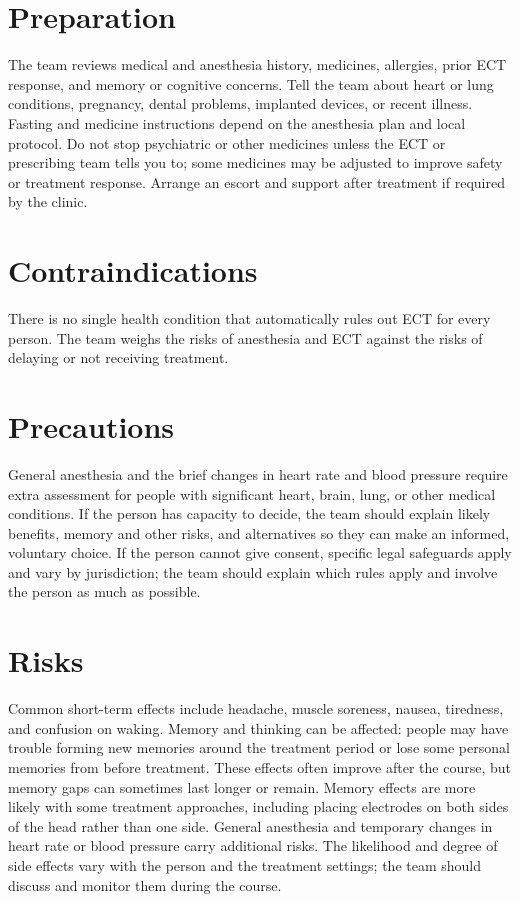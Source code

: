 \section*{Preparation}
The team reviews medical and anesthesia history, medicines, allergies, prior ECT response, and memory or cognitive concerns. Tell the team about heart or lung conditions, pregnancy, dental problems, implanted devices, or recent illness. Fasting and medicine instructions depend on the anesthesia plan and local protocol. Do not stop psychiatric or other medicines unless the ECT or prescribing team tells you to; some medicines may be adjusted to improve safety or treatment response. Arrange an escort and support after treatment if required by the clinic.

\section*{Contraindications}
There is no single health condition that automatically rules out ECT for every person. The team weighs the risks of anesthesia and ECT against the risks of delaying or not receiving treatment.

\section*{Precautions}
General anesthesia and the brief changes in heart rate and blood pressure require extra assessment for people with significant heart, brain, lung, or other medical conditions. If the person has capacity to decide, the team should explain likely benefits, memory and other risks, and alternatives so they can make an informed, voluntary choice. If the person cannot give consent, specific legal safeguards apply and vary by jurisdiction; the team should explain which rules apply and involve the person as much as possible.

\section*{Risks}
Common short-term effects include headache, muscle soreness, nausea, tiredness, and confusion on waking. Memory and thinking can be affected: people may have trouble forming new memories around the treatment period or lose some personal memories from before treatment. These effects often improve after the course, but memory gaps can sometimes last longer or remain. Memory effects are more likely with some treatment approaches, including placing electrodes on both sides of the head rather than one side. General anesthesia and temporary changes in heart rate or blood pressure carry additional risks. The likelihood and degree of side effects vary with the person and the treatment settings; the team should discuss and monitor them during the course.


